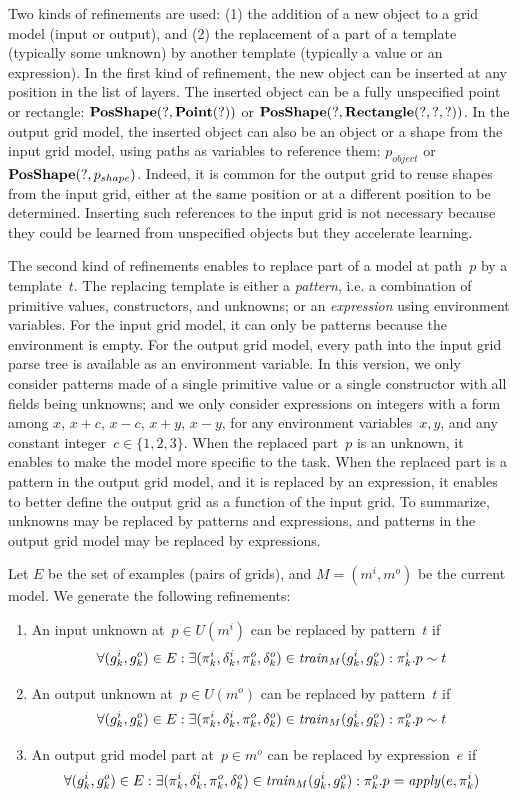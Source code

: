 \documentclass[a4paper]{llncs}
\begin{document}
Two kinds of refinements are used: (1) the addition of a new object to
a grid model (input or output), and (2) the replacement of a part of a
template (typically some unknown) by another template (typically a
value or an expression).
%
In the first kind of refinement, the new object can be inserted at any
position in the list of layers. The inserted object can be a fully
unspecified point or rectangle: ${\bf PosShape}(?, {\bf Point}(?))$ or
${\bf PosShape}(?, {\bf Rectangle}(?,?,?))$. In the output grid model,
the inserted object can also be an object or a shape from the input
grid model, using paths as variables to reference them: $p_{object}$
or ${\bf PosShape}(?, p_{shape})$. Indeed, it is common for the output
grid to reuse shapes from the input grid, either at the same position
or at a different position to be determined. Inserting such references
to the input grid is not necessary because they could be learned from
unspecified objects but they accelerate learning.

The second kind of refinements enables to replace part of a model at
path~$p$ by a template~$t$. The replacing template is either a {\em
  pattern}, i.e. a combination of primitive values, constructors, and
unknowns; or an {\em expression} using environment variables. For the
input grid model, it can only be patterns because the environment is
empty. For the output grid model, every path into the input grid parse
tree is available as an environment variable.
%
In this version, we only consider patterns made of a single primitive
value or a single constructor with all fields being unknowns; and we
only consider expressions on integers with a form among $x$, $x+c$,
$x-c$, $x+y$, $x-y$, for any environment variables~$x,y$, and any
constant integer~$c \in \{1,2,3\}$.
%
When the replaced part~$p$ is an unknown, it enables to make the model
more specific to the task. When the replaced part is a pattern in the
output grid model, and it is replaced by an expression, it enables to
better define the output grid as a function of the input grid. To
summarize, unknowns may be replaced by patterns and expressions, and
patterns in the output grid model may be replaced by expressions.

Let $E$ be the set of examples (pairs of grids), and $M = (m^i,m^o)$
be the current model. We generate the following refinements:
\begin{enumerate}
\item An input unknown at~$p \in U(m^i)$ can be replaced by
  pattern~$t$ if
\[ \forall (g^i_k,g^o_k) \in E: \exists (\pi^i_k,\delta^i_k,\pi^o_k,\delta^o_k) \in {\it
    train}_M(g^i_k,g^o_k): \pi^i_k.p \sim t \]
%
\item An output unknown at~$p \in U(m^o)$ can be replaced by
pattern~$t$ if
\[ \forall (g^i_k,g^o_k) \in E: \exists (\pi^i_k,\delta^i_k,\pi^o_k,\delta^o_k) \in {\it
    train}_M(g^i_k,g^o_k): \pi^o_k.p \sim t \]
%
\item An output grid model part at~$p \in m^o$ can be replaced by expression~$e$ if
\[ \forall (g^i_k,g^o_k) \in E: \exists (\pi^i_k,\delta^i_k,\pi^o_k,\delta^o_k) \in {\it
    train}_M(g^i_k,g^o_k): \pi^o_k.p = {\it apply}(e, \pi^i_k) \]
\end{enumerate}
\end{document}
